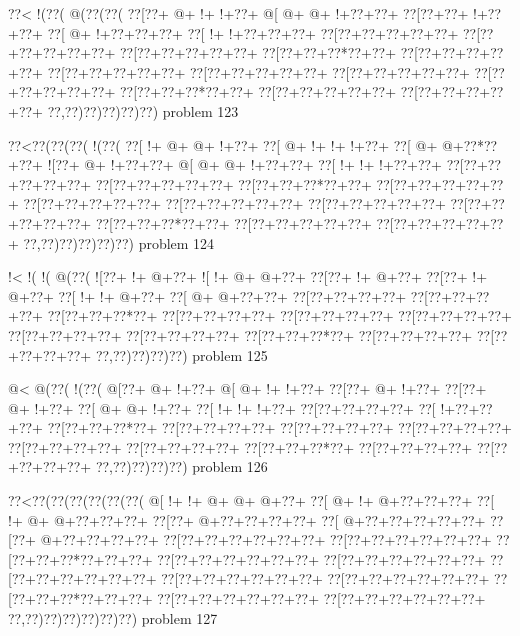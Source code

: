 \vbox{\vbox{\goo
\0??<\- !(\0??(\- @(\0??(\0??(
\0??[\0??+\- @+\- !+\- !+\0??+
\- @[\- @+\- @+\- !+\0??+\0??+
\0??[\0??+\0??+\- !+\0??+\0??+
\0??[\- @+\- !+\0??+\0??+\0??+
\0??[\- !+\- !+\0??+\0??+\0??+
\0??[\0??+\0??+\0??+\0??+\0??+
\0??[\0??+\0??+\0??+\0??+\0??+
\0??[\0??+\0??+\0??+\0??+\0??+
\0??[\0??+\0??+\0??*\0??+\0??+
\0??[\0??+\0??+\0??+\0??+\0??+
\0??[\0??+\0??+\0??+\0??+\0??+
\0??[\0??+\0??+\0??+\0??+\0??+
\0??[\0??+\0??+\0??+\0??+\0??+
\0??[\0??+\0??+\0??+\0??+\0??+
\0??[\0??+\0??+\0??*\0??+\0??+
\0??[\0??+\0??+\0??+\0??+\0??+
\0??[\0??+\0??+\0??+\0??+\0??+
\0??,\0??)\0??)\0??)\0??)\0??)
}
\hfil problem 123\hfil\break
}

\vbox{\vbox{\goo
\0??<\0??(\0??(\0??(\- !(\0??(
\0??[\- !+\- @+\- @+\- !+\0??+
\0??[\- @+\- !+\- !+\- !+\0??+
\0??[\- @+\- @+\0??*\0??+\0??+
\- ![\0??+\- @+\- !+\0??+\0??+
\- @[\- @+\- @+\- !+\0??+\0??+
\0??[\- !+\- !+\- !+\0??+\0??+
\0??[\0??+\0??+\0??+\0??+\0??+
\0??[\0??+\0??+\0??+\0??+\0??+
\0??[\0??+\0??+\0??*\0??+\0??+
\0??[\0??+\0??+\0??+\0??+\0??+
\0??[\0??+\0??+\0??+\0??+\0??+
\0??[\0??+\0??+\0??+\0??+\0??+
\0??[\0??+\0??+\0??+\0??+\0??+
\0??[\0??+\0??+\0??+\0??+\0??+
\0??[\0??+\0??+\0??*\0??+\0??+
\0??[\0??+\0??+\0??+\0??+\0??+
\0??[\0??+\0??+\0??+\0??+\0??+
\0??,\0??)\0??)\0??)\0??)\0??)
}
\hfil problem 124\hfil\break
}

\vbox{\vbox{\goo
\- !<\- !(\- !(\- @(\0??(
\- ![\0??+\- !+\- @+\0??+
\- ![\- !+\- @+\- @+\0??+
\0??[\0??+\- !+\- @+\0??+
\0??[\0??+\- !+\- @+\0??+
\0??[\- !+\- !+\- @+\0??+
\0??[\- @+\- @+\0??+\0??+
\0??[\0??+\0??+\0??+\0??+
\0??[\0??+\0??+\0??+\0??+
\0??[\0??+\0??+\0??*\0??+
\0??[\0??+\0??+\0??+\0??+
\0??[\0??+\0??+\0??+\0??+
\0??[\0??+\0??+\0??+\0??+
\0??[\0??+\0??+\0??+\0??+
\0??[\0??+\0??+\0??+\0??+
\0??[\0??+\0??+\0??*\0??+
\0??[\0??+\0??+\0??+\0??+
\0??[\0??+\0??+\0??+\0??+
\0??,\0??)\0??)\0??)\0??)
}
\hfil problem 125\hfil\break
}

\vbox{\vbox{\goo
\- @<\- @(\0??(\- !(\0??(
\- @[\0??+\- @+\- !+\0??+
\- @[\- @+\- !+\- !+\0??+
\0??[\0??+\- @+\- !+\0??+
\0??[\0??+\- @+\- !+\0??+
\0??[\- @+\- @+\- !+\0??+
\0??[\- !+\- !+\- !+\0??+
\0??[\0??+\0??+\0??+\0??+
\0??[\- !+\0??+\0??+\0??+
\0??[\0??+\0??+\0??*\0??+
\0??[\0??+\0??+\0??+\0??+
\0??[\0??+\0??+\0??+\0??+
\0??[\0??+\0??+\0??+\0??+
\0??[\0??+\0??+\0??+\0??+
\0??[\0??+\0??+\0??+\0??+
\0??[\0??+\0??+\0??*\0??+
\0??[\0??+\0??+\0??+\0??+
\0??[\0??+\0??+\0??+\0??+
\0??,\0??)\0??)\0??)\0??)
}
\hfil problem 126\hfil\break
}

\vbox{\vbox{\goo
\0??<\0??(\0??(\0??(\0??(\0??(\0??(
\- @[\- !+\- !+\- @+\- @+\- @+\0??+
\0??[\- @+\- !+\- @+\0??+\0??+\0??+
\0??[\- !+\- @+\- @+\0??+\0??+\0??+
\0??[\0??+\- @+\0??+\0??+\0??+\0??+
\0??[\- @+\0??+\0??+\0??+\0??+\0??+
\0??[\0??+\- @+\0??+\0??+\0??+\0??+
\0??[\0??+\0??+\0??+\0??+\0??+\0??+
\0??[\0??+\0??+\0??+\0??+\0??+\0??+
\0??[\0??+\0??+\0??*\0??+\0??+\0??+
\0??[\0??+\0??+\0??+\0??+\0??+\0??+
\0??[\0??+\0??+\0??+\0??+\0??+\0??+
\0??[\0??+\0??+\0??+\0??+\0??+\0??+
\0??[\0??+\0??+\0??+\0??+\0??+\0??+
\0??[\0??+\0??+\0??+\0??+\0??+\0??+
\0??[\0??+\0??+\0??*\0??+\0??+\0??+
\0??[\0??+\0??+\0??+\0??+\0??+\0??+
\0??[\0??+\0??+\0??+\0??+\0??+\0??+
\0??,\0??)\0??)\0??)\0??)\0??)\0??)
}
\hfil problem 127\hfil\break
}

